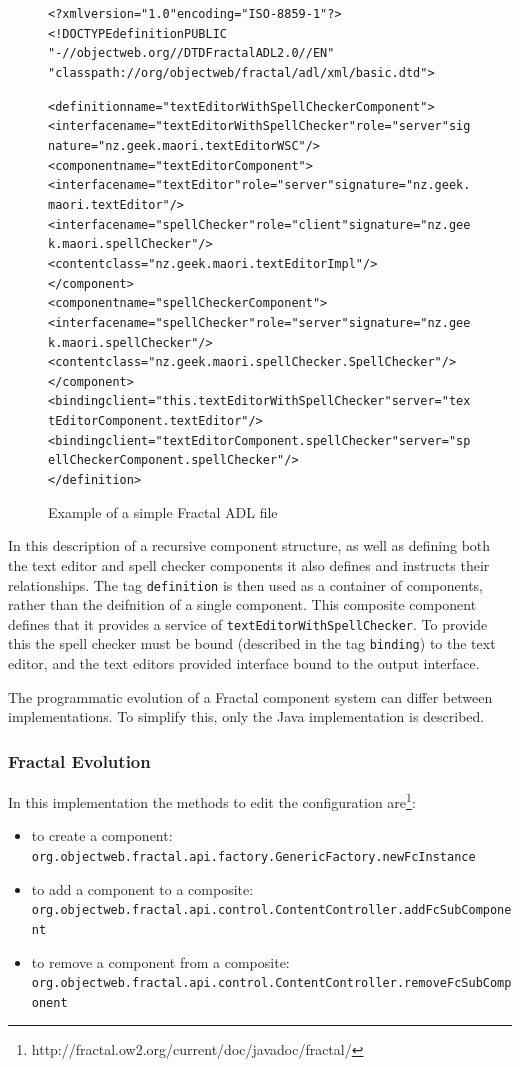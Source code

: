 \begin{figure}[htp]
\begin{center}
\begin{alltt}
<?xml version="1.0" encoding="ISO-8859-1" ?>
<!DOCTYPE definition PUBLIC 
    "-//objectweb.org//DTD Fractal ADL 2.0//EN" 
    "classpath://org/objectweb/fractal/adl/xml/basic.dtd">

<definition name="textEditorWithSpellCheckerComponent">
  <interface name="textEditorWithSpellChecker" role="server" signature="nz.geek.maori.textEditorWSC"/>
  <component name="textEditorComponent">
    <interface name="textEditor" role="server" signature="nz.geek.maori.textEditor"/>
    <interface name="spellChecker" role="client" signature="nz.geek.maori.spellChecker"/>
    <content class="nz.geek.maori.textEditorImpl"/>
  </component>
  <component name="spellCheckerComponent">
    <interface name="spellChecker" role="server" signature="nz.geek.maori.spellChecker"/>
    <content class="nz.geek.maori.spellChecker.SpellChecker"/>
  </component>
  <binding client="this.textEditorWithSpellChecker" server="textEditorComponent.textEditor"/>
  <binding client="textEditorComponent.spellChecker" server="spellCheckerComponent.spellChecker"/>
</definition>
\end{alltt}
  \caption[Fractal ADL Example]{Example of a simple Fractal ADL file}
  \label{fractalmetadata}
\end{center}
\end{figure}

In this description of a recursive component structure, as well as defining both the text editor and spell checker components it also defines and instructs their relationships.
The tag \verb+definition+ is then used as a container of components, rather than the deifnition of a single component.
This composite component defines that it provides a service of \verb+textEditorWithSpellChecker+.
To provide this the spell checker must be bound (described in the tag \verb+binding+) to the text editor,
and the text editors provided interface bound to the output interface. 

The programmatic evolution of a Fractal component system can differ between implementations.
To simplify this, only the Java implementation is described. 

\subsubsection{Fractal Evolution}
In this implementation the methods to edit the configuration are\footnote{http://fractal.ow2.org/current/doc/javadoc/fractal/}:
\begin{itemize}
  \item to create a component: \verb+org.objectweb.fractal.api.factory.GenericFactory.newFcInstance+
  \item to add a component to a composite: \verb+org.objectweb.fractal.api.control.ContentController.addFcSubComponent+
  \item to remove a component from a composite: \verb+org.objectweb.fractal.api.control.ContentController.removeFcSubComponent+
\end{itemize}

